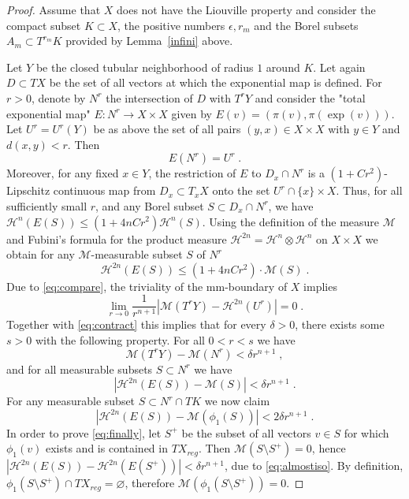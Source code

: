 \documentclass[12pt,leqno,intlimits]{amsart}
\numberwithin{equation}{section}
\theoremstyle{definition}
\theoremstyle{remark}
\newcommand{\lref}[1]{Lemma~\ref{#1}}
\def\:{\colon}
\def\emptyset{\varnothing}
\begin{document}
\begin{proof}
Assume that $X$ does not have the Liouville property and consider the compact subset $K \subset X$, the positive numbers $\epsilon, r_m$ and the Borel
subsets $A_m\subset T^{r_m} K$ provided by \lref{infini} above.

Let $Y$ be the closed tubular neighborhood  of radius $1$ around $K$.
Let again $D\subset TX$ be the set of all vectors at which the exponential map is defined.
  For $r>0$, denote  by $N^r$ the intersection of $D$ with $T^r Y$ and consider the "total exponential map"
$E\:N^r \to X\times X$ given by $E(v)= (\pi (v), \pi (\exp (v)))$.   Let $U^r =U^r(Y)$ be as above the set of all
  pairs $(y,x) \in X\times X$ with $y\in Y$ and $d(x,y)<r$. Then
\begin{equation} \label{eq:image}
E(N^r) =U^r \; .
\end{equation}
Moreover, for any  fixed $x \in Y$, the restriction of $E$ to $D_x \cap N^r$ is
a $(1+ C r^2)$-Lipschitz continuous map from $D_x\subset T_xX$ onto the set  $U^r \cap \{x \} \times X$.
Thus, for all sufficiently small $r$, and any Borel subset $S\subset D_x \cap N^r$, we have
$\mathcal H^n (E(S)) \leq (1+4n C r^2) \mathcal H^n (S)$.  Using the definition of the measure $\mathcal M$ and  Fubini's formula for the product measure
$\mathcal H^{2n} =\mathcal H^n \otimes \mathcal H^n $ on $X\times X$ we obtain for any $\mathcal M$-measurable subset $S$ of $N^r$
\begin{equation} \label{eq:contract}
\mathcal H^{2n} (E(S)) \leq (1+4nC r^2) \cdot \mathcal M(S)\; .
\end{equation}
Due to \eqref{eq:compare}, the triviality of the mm-boundary of $X$ implies
$$\lim _{r\to 0} \frac 1 {r^{n+1} } |\mathcal M(T^r Y) -\mathcal H^{2n} (U^r)| =0 \;.$$
	Together with  \eqref{eq:contract} this implies that for every  $\delta >0$, there exists some $s>0$ with the following property. For all $0<r<s$
	we have
	\begin{equation}  \label{eq:almostall}
	\mathcal M (T^r Y)- \mathcal M (N^r) < \delta r^{n+1} \; ,
	\end{equation}
	and  for all measurable subsets $S\subset N^r$ we have
	\begin{equation}  \label{eq:almostiso}
	|\mathcal H^{2n} (E(S)) - \mathcal M  (S)|  < \delta r^{n+1} \;.
\end{equation}
For any measurable subset $S\subset N^r \cap TK$  we now claim
\begin{equation} \label{eq:finally}
|\mathcal H^{2n} (E(S)) - \mathcal M (\phi _1 (S))|  <  2 \delta r^{n+1} \; .
\end{equation}
In order to prove \eqref{eq:finally}, let $S^+$ be the subset of all vectors $v\in S $ for which $\phi_1 (v)$ exists  and is contained in $TX_{reg}$.
Then $ \mathcal M (S\setminus S^+ )=0 $, hence $|\mathcal H^{2n} (E(S))- \mathcal H^{2n} (E(S^+))|< \delta r^{n+1} $, due to  \eqref{eq:almostiso}.
 By definition, $\phi _1 (S\setminus S^+)\cap TX_{reg} =\emptyset$, therefore $\mathcal M (\phi _1 (S\setminus S^+)) =0$.



\end{proof}
\end{document}
